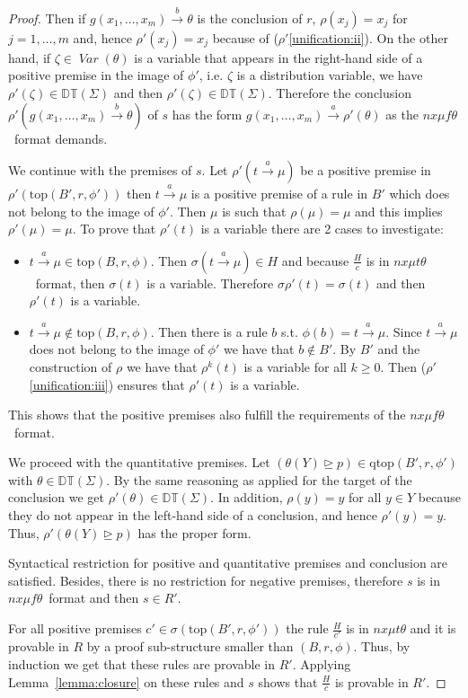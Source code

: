 \documentclass[submission,copyright,creativecommons]{eptcs}
\newcommand{\trans}[1][]{\xrightarrow{\, {#1} \, }}
\newcommand{\gtgeq}{\trianglerighteq}
\newcommand{\openDT}{\mathbb{DT}}
\newcommand{\openDTerms}{\openDT(\Sigma)}
\newcommand{\Var}{\mathop{\textit{Var}}}
\newcommand{\nxmuft}{\ensuremath{\textit{nx}\mu\textit{f}\theta}}
\newcommand{\nxmutt}{\ensuremath{\textit{nx}\mu\textit{t}\theta}}
\newcommand{\rtop}{\text{top}}
\newcommand{\qtop}{\text{qtop}}
\begin{document}
\begin{proof}
 Then if $g(x_1, \dots, x_m) \trans[b] \theta$ is the conclusion of $r$, 
 $\rho(x_j) = x_j$ for $j=1, \dots, m$ and, 
 hence $\rho'(x_j) = x_j$ because of ($\rho'$\ref{unification:ii}).
On the other hand, if $\zeta \in \Var(\theta)$ is a variable that appears in the right-hand 
 side of a positive premise in the image of $\phi'$, i.e. $\zeta$ is a distribution variable, 
 we have $\rho'(\zeta) \in \openDTerms$ and then 
 $\rho'(\zeta) \in \openDTerms$. 
 Therefore the conclusion $\rho'(g(x_1, \dots, x_m) \trans[b] \theta)$ of $s$ 
 has the form $g(x_1, \dots, x_m) \trans[a] \rho'(\theta)$ as the \nxmuft\ format demands. 


 We continue with the premises of $s$.   
 Let $\rho'(t \trans[a] \mu)$ be a positive premise in $\rho'(\rtop(B', r , \phi'))$ 
 then $t \trans[a] \mu$ is a positive premise of a rule in $B'$ which does not belong
 to the image of $\phi'$. Then
 $\mu$ is such that $\rho(\mu) = \mu$ and this implies $\rho'(\mu) = \mu$.
To prove that $\rho'(t)$ is a variable there are 2 cases to investigate:

\begin{itemize}
 \item $t \trans[a] \mu \in \text{top}(B,r,\phi)$. 
Then $\sigma(t \trans[a] \mu) \in H$ and because $\frac{H}{c}$ is in  \nxmutt\ format, 
 then $\sigma(t)$ is a variable.
 Therefore $\sigma \rho'(t) = \sigma(t)$ and then $\rho'(t)$ is a variable.
\item $t \trans[a] \mu \not \in \text{top}(B,r,\phi)$.
Then there is a rule $b$ s.t. $\phi(b) = t \trans[a] \mu$.
  Since  $t \trans[a] \mu$ does not belong to the image of $\phi'$ we have that 
  $b \not  \in B'$. By $B'$ and the construction of $\rho$
  we have that $\rho^k(t)$ is a variable for all $k\geq 0$. 
  Then ($\rho'$\ref{unification:iii}) ensures that $\rho'(t)$ is a variable.  
\end{itemize}

This shows that the positive premises also fulfill the requirements of the \nxmuft\ format.

We proceed with the quantitative premises. 
Let $(\theta (Y) \gtgeq p) \in \qtop(B', r, \phi')$ with $\theta \in \openDTerms$.
By the same reasoning as applied for the target of the conclusion we get $\rho'(\theta) \in \openDTerms$. 
In addition, $\rho(y) = y$ for all $y \in Y$ because they do not appear in the left-hand side of a conclusion, and hence $\rho'(y) = y$.
Thus, $\rho'(\theta (Y) \gtgeq p)$ has the proper form.

Syntactical restriction for positive and quantitative premises  and conclusion are satisfied.
Besides, there is no restriction for negative premises, therefore $s$ is in \nxmuft\ format 
and then $s \in R'$.


 For all positive premises $c'\in \sigma(\rtop(B', r, \phi'))$ the rule $\frac{H}{c'}$
 is in $\nxmutt$ and it is provable in $R$ by a proof sub-structure smaller 
 than $(B, r, \phi)$. Thus, by induction we get that these rules are provable in $R'$.
 Applying Lemma~\ref{lemma:closure} on these rules and $s$ shows that $\frac{H}{c}$ is provable in $R'$.
\end{proof}
\end{document}
